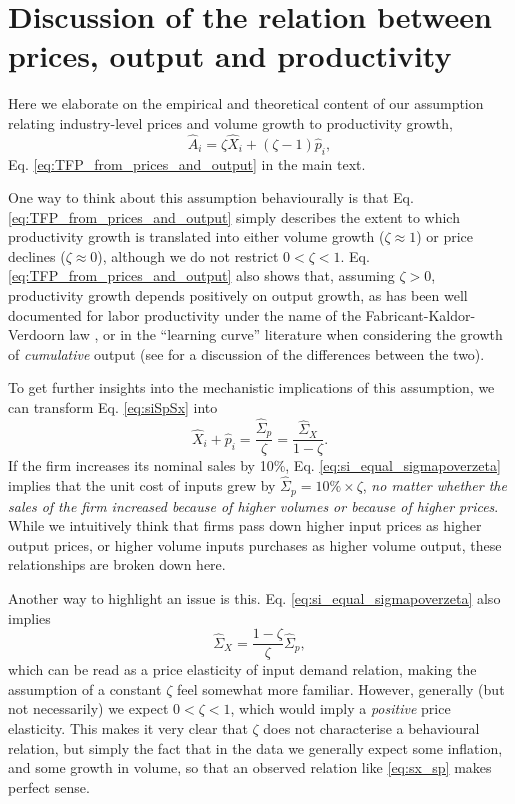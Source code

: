 \section{Discussion of the relation between prices, output and productivity}
\label{appendix:TFP_from_prices_and_output}

Here we elaborate on the empirical and theoretical content of our assumption relating industry-level prices and volume growth to productivity growth,
\[
\hat{A}_i = \zeta \hat{X}_i + (\zeta - 1) \hat{p}_i,
\]
Eq. \ref{eq:TFP_from_prices_and_output} in the main text.

One way to think about this assumption behaviourally is that Eq. \ref{eq:TFP_from_prices_and_output} simply describes the extent to which productivity growth is translated into either volume growth ($\zeta \approx 1$) or price declines ($\zeta \approx 0$), although we do not restrict $0<\zeta<1$. Eq. \ref{eq:TFP_from_prices_and_output} also shows that, assuming $\zeta>0$, productivity growth depends positively on output growth, as has been well documented for labor productivity under the name of the Fabricant-Kaldor-Verdoorn law \citep{metcalfe2006adaptive}, or in the ``learning curve'' literature when considering the growth of \textit{cumulative} output (see \citet{lafond2022can} for a discussion of the differences between the two).

To get further insights into the mechanistic implications of this assumption, we can transform Eq. \ref{eq:siSpSx} into 
\begin{equation}
   \hat{X}_i + \hat{p}_i = \frac{\hat{\Sigma}_p}{\zeta} = \frac{\hat{\Sigma}_X}{1-\zeta}.
   \label{eq:si_equal_sigmapoverzeta}
\end{equation}
If the firm increases its nominal sales by 10\%, Eq. \eqref{eq:si_equal_sigmapoverzeta} implies that the unit cost of inputs grew by $\hat{\Sigma}_p = 10\% \times \zeta$, \textit{no matter whether the sales of the firm increased because of higher volumes or  because of higher prices}. While we intuitively think that firms pass down higher input prices as higher output prices, or higher volume inputs purchases as higher volume output, these relationships are broken down here.

Another way to highlight an issue is this. Eq. \eqref{eq:si_equal_sigmapoverzeta} also implies 
\begin{equation}
\hat{\Sigma}_X = \frac{1-\zeta}{\zeta} \hat{\Sigma}_p,
\label{eq:sx_sp}    
\end{equation}
which can be read as a price elasticity of input demand relation, making the assumption of a constant $\zeta$ feel somewhat more familiar. However, generally (but not necessarily) we expect $0<\zeta<1$, which would imply a \textit{positive} price elasticity. This makes it very clear that $\zeta$ does not characterise a behavioural relation, but simply the fact that in the data we generally expect some inflation, and some growth in volume, so that an observed relation like \eqref{eq:sx_sp} makes perfect sense. 

